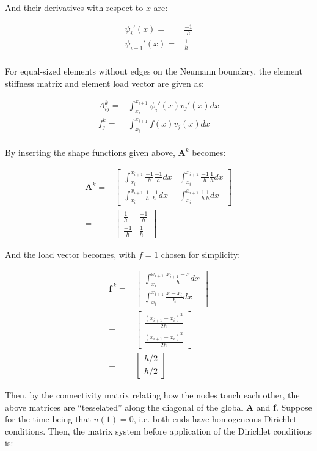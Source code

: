 \documentclass[10pt]{article}
\newcommand{\beqa}{\begin{equation}\begin{aligned}}
\newcommand{\eeqa}{\end{aligned}\end{equation}}
\begin{document}
And their derivatives with respect to \(x\) are:

\beqa
\psi_i'(x)=&\frac{-1}{h}\\
\psi_{i+1}'(x) =&\frac{1}{h}\\
\eeqa

For equal-sized elements without edges on the Neumann boundary, the element stiffness matrix and element load vector are given as:

\beqa
A_{ij}^k=&\int_{x_i}^{x_{i+1}}\psi_i'(x)v_j'(x)dx\\
f_j^k=&\int_{x_i}^{x_{i+1}}f(x)v_j(x)dx\\
\eeqa

By inserting the shape functions given above, \(\textbf{A}^k\) becomes:

\beqa
\textbf{A}^k=& \begin{bmatrix}	\int_{x_i}^{x_{i+1}}\frac{-1}{h}\frac{-1}{h}dx & 
										\int_{x_i}^{x_{i+1}}\frac{-1}{h}\frac{1}{h}dx\\
										\int_{x_i}^{x_{i+1}}\frac{1}{h}\frac{-1}{h}dx &
										\int_{x_i}^{x_{i+1}}\frac{1}{h}\frac{1}{h}dx
					\end{bmatrix}\\
			   =& \begin{bmatrix}	\frac{1}{h} & 
										\frac{-1}{h}\\
										\frac{-1}{h} &
										\frac{1}{h}
					\end{bmatrix}
\eeqa

And the load vector becomes, with \(f=1\) chosen for simplicity:

\beqa
\textbf{f}^{\ k}=& \begin{bmatrix}	\int_{x_i}^{x_{i+1}}\frac{x_{i+1}-x}{h}dx \\
										\int_{x_i}^{x_{i+1}}\frac{x-x_i}{h}dx
					\end{bmatrix}\\
			   =& \begin{bmatrix}	\frac{(x_{i+1}-x_i)^2}{2h}\\
										\frac{(x_{i+1}-x_i)^2}{2h}
					\end{bmatrix}\\
				=& \begin{bmatrix}	h/2\\ 
										h/2
					\end{bmatrix}
\eeqa

Then, by the connectivity matrix relating how the nodes touch each other, the above matrices are ``tesselated'' along the diagonal of the global \textbf{A} and \textbf{f}. Suppose for the time being that \(u(1)=0\), i.e. both ends have homogeneous Dirichlet conditions. Then, the matrix system before application of the Dirichlet conditions is:
\end{document}
